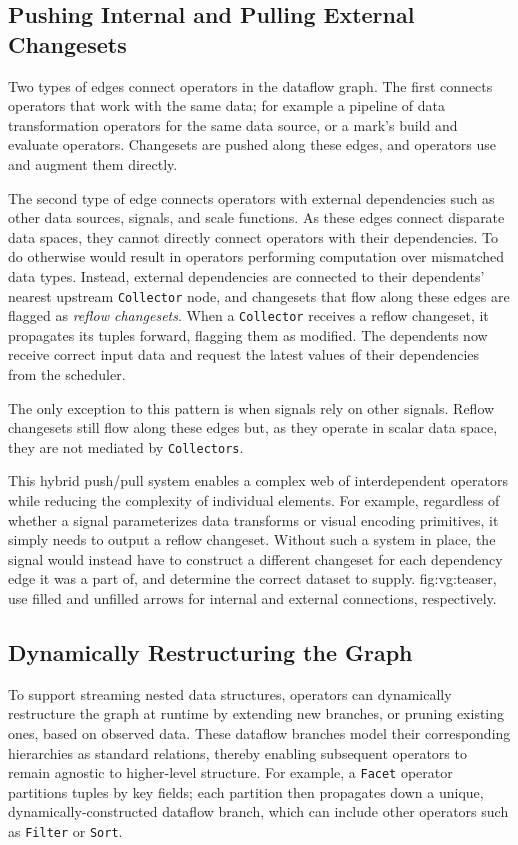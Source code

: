 \subsection{Pushing Internal and Pulling External Changesets}

Two types of edges connect operators in the dataflow graph. The first connects
operators that work with the same data; for example a pipeline of data
transformation operators for the same data source, or a mark's build and
evaluate operators. Changesets are pushed along these edges, and operators
use and augment them directly.

The second type of edge connects operators with external dependencies such as
other data sources, signals, and scale functions. As these edges connect
disparate data spaces, they cannot directly connect operators with their
dependencies. To do otherwise would result in operators performing computation
over mismatched data types. Instead, external dependencies are connected to
their dependents' nearest upstream \texttt{Collector} node, and changesets that
flow along these edges are flagged as \emph{reflow changesets}. When a
\texttt{Collector} receives a reflow changeset, it propagates its tuples
forward, flagging them as modified. The dependents now receive correct input
data and request the latest values of their dependencies from the scheduler.

The only exception to this pattern is when signals rely on other signals.
Reflow changesets still flow along these edges but, as they operate in scalar
data space, they are not mediated by \texttt{Collectors}.

This hybrid push/pull system enables a complex web of interdependent operators
while reducing the complexity of individual elements. For example, regardless of
whether a signal parameterizes data transforms or visual encoding primitives, it
simply needs to output a reflow changeset. Without such a system in place, the
signal would instead have to construct a different changeset for each dependency
edge it was a part of, and determine the correct dataset to supply. \Cref
{fig:vg:teaser,} use
filled and unfilled arrows for internal and external
connections, respectively.

\subsection{Dynamically Restructuring the Graph}

To support streaming nested data structures, operators can dynamically
restructure the graph at runtime by extending new branches, or pruning
existing ones, based on observed data. These dataflow branches model their
corresponding hierarchies as standard relations, thereby enabling subsequent
operators to remain agnostic to higher-level structure. For example, a
\texttt{Facet} operator partitions tuples by key fields; each partition then
propagates down a unique, dynamically-constructed dataflow branch, which can
include other operators such as \texttt{Filter} or \texttt{Sort}.

